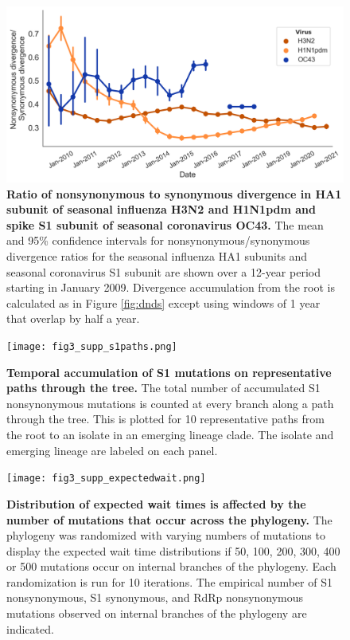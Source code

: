\documentclass[11pt,oneside,letterpaper]{article}
\begin{document}
\begin{figure}[h!]
\centerline{\includegraphics[scale=0.55]{fig2_supp_seasonalflu.png}}
\caption{\textbf{Ratio of nonsynonymous to synonymous divergence in HA1 subunit of seasonal influenza H3N2 and H1N1pdm and spike S1 subunit of seasonal coronavirus OC43.}
The mean and 95\% confidence intervals for nonsynonymous/synonymous divergence ratios for the seasonal influenza HA1 subunits and seasonal coronavirus S1 subunit are shown over a 12-year period starting in January 2009. Divergence accumulation from the root is calculated as in Figure \ref{fig:dnds} except using windows of 1 year that overlap by half a year.
}
\label{fig:seasonaldnds}
\end{figure}

\begin{figure}[h!]
\centerline{\texttt{[image: fig3\_supp\_s1paths.png]}}
\caption{\textbf{Temporal accumulation of S1 mutations on representative paths through the tree.}
The total number of accumulated S1 nonsynonymous mutations is counted at every branch along a path through the tree. This is plotted for 10 representative paths from the root to an isolate in an emerging lineage clade. The isolate and emerging lineage are labeled on each panel.
}
\label{fig:s1paths}
\end{figure}

\begin{figure}[h!]
\centerline{\texttt{[image: fig3\_supp\_expectedwait.png]}}
\caption{\textbf{Distribution of expected wait times is affected by the number of mutations that occur across the phylogeny.}
The phylogeny was randomized with varying numbers of mutations to display the expected wait time distributions if 50, 100, 200, 300, 400 or 500 mutations occur on internal branches of the phylogeny. Each randomization is run for 10 iterations. The empirical number of S1 nonsynonymous, S1 synonymous, and RdRp nonsynonymous mutations observed on internal branches of the phylogeny are indicated.
}
\label{fig:expectedwait}
\end{figure}
\end{document}
